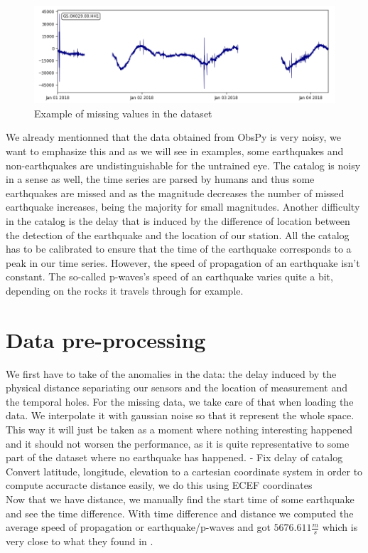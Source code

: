 \documentclass[10pt,conference,compsocconf]{IEEEtran}
\begin{document}
\begin{figure}[h]
  \centering
	\includegraphics[width=\columnwidth]{hole_example.png}
  \caption{Example of missing values in the dataset}
	\label{fig:10min-example}
\end{figure}

We already mentionned that the data obtained from ObsPy is very noisy, we want to emphasize this and as we will see in examples, some earthquakes and non-earthquakes are undistinguishable for the untrained eye. The catalog is noisy in a sense as well, the time series are parsed by humans and thus some earthquakes are missed and as the magnitude decreases the number of missed earthquake increases, being the majority for small magnitudes. Another difficulty in the catalog is the delay that is induced by the difference of location between the detection of the earthquake and the location of our station. All the catalog has to be calibrated to ensure that the time of the earthquake corresponds to a peak in our time series. However, the speed of propagation of an earthquake isn't constant. The so-called p-waves's speed of an earthquake varies quite a bit, depending on the rocks it travels through for example.

\section{Data pre-processing}
We first have to take of the anomalies in the data: the delay induced by the physical distance separiating our sensors and the location of measurement and the temporal holes.\newline
For the missing data, we take care of that when loading the data. We interpolate it with gaussian noise so that it represent the whole space. This way it will just be taken as a moment where nothing interesting happened and it should not worsen the performance, as it is quite representative to some part of the dataset where no earthquake has happened.
- Fix delay of catalog\\
Convert latitude, longitude, elevation to a cartesian coordinate system in order to compute accuracte distance easily, we do this using ECEF coordinates\cite{ECEFPaper}\\
Now that we have distance, we manually find the start time of some earthquake and see the time difference. With time difference and distance we computed the average speed of propagation or earthquake/p-waves and got $5676.611\frac{m}{s}$ which is very close to what they found in \cite{PWavePaper}.
\end{document}
